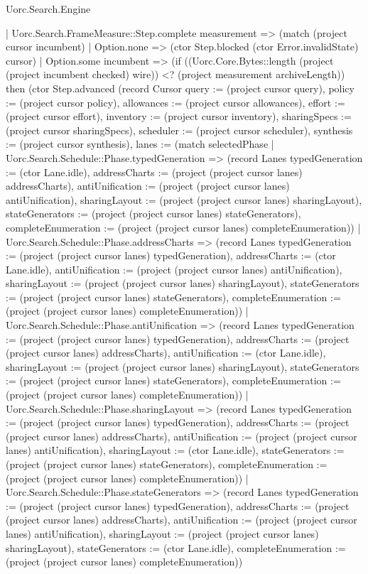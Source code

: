 \begin{lexlean}{Uorc.Search.Engine}
\begin{semanticmodule}
{      | Uorc.Search.FrameMeasure::Step.complete measurement => (match (project cursor incumbent)
        | Option.none => (ctor Step.blocked (ctor Error.invalidState) cursor)
        | Option.some incumbent => (if ((Uorc.Core.Bytes::length (project (project incumbent checked) wire)) <? (project measurement archiveLength)) then (ctor Step.advanced (record Cursor {query := (project cursor query), policy := (project cursor policy), allowances := (project cursor allowances), effort := (project cursor effort), inventory := (project cursor inventory), sharingSpecs := (project cursor sharingSpecs), scheduler := (project cursor scheduler), synthesis := (project cursor synthesis), lanes := (match selectedPhase
          | Uorc.Search.Schedule::Phase.typedGeneration => (record Lanes {typedGeneration := (ctor Lane.idle), addressCharts := (project (project cursor lanes) addressCharts), antiUnification := (project (project cursor lanes) antiUnification), sharingLayout := (project (project cursor lanes) sharingLayout), stateGenerators := (project (project cursor lanes) stateGenerators), completeEnumeration := (project (project cursor lanes) completeEnumeration)})
          | Uorc.Search.Schedule::Phase.addressCharts => (record Lanes {typedGeneration := (project (project cursor lanes) typedGeneration), addressCharts := (ctor Lane.idle), antiUnification := (project (project cursor lanes) antiUnification), sharingLayout := (project (project cursor lanes) sharingLayout), stateGenerators := (project (project cursor lanes) stateGenerators), completeEnumeration := (project (project cursor lanes) completeEnumeration)})
          | Uorc.Search.Schedule::Phase.antiUnification => (record Lanes {typedGeneration := (project (project cursor lanes) typedGeneration), addressCharts := (project (project cursor lanes) addressCharts), antiUnification := (ctor Lane.idle), sharingLayout := (project (project cursor lanes) sharingLayout), stateGenerators := (project (project cursor lanes) stateGenerators), completeEnumeration := (project (project cursor lanes) completeEnumeration)})
          | Uorc.Search.Schedule::Phase.sharingLayout => (record Lanes {typedGeneration := (project (project cursor lanes) typedGeneration), addressCharts := (project (project cursor lanes) addressCharts), antiUnification := (project (project cursor lanes) antiUnification), sharingLayout := (ctor Lane.idle), stateGenerators := (project (project cursor lanes) stateGenerators), completeEnumeration := (project (project cursor lanes) completeEnumeration)})
          | Uorc.Search.Schedule::Phase.stateGenerators => (record Lanes {typedGeneration := (project (project cursor lanes) typedGeneration), addressCharts := (project (project cursor lanes) addressCharts), antiUnification := (project (project cursor lanes) antiUnification), sharingLayout := (project (project cursor lanes) sharingLayout), stateGenerators := (ctor Lane.idle), completeEnumeration := (project (project cursor lanes) completeEnumeration)})
}}
\end{semanticmodule}
\end{lexlean}
